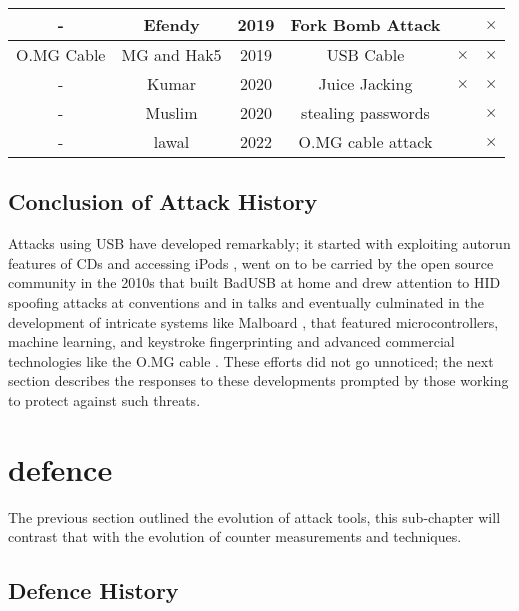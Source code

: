 {\begin{tabular}{|c c c c c c|}
 \hline
  - & Efendy\cite{efendyExploringPossibilityUSB2019} & 2019 & Fork Bomb Attack & & $\times$ \\
 \hline
 O.MG Cable & MG and Hak5  \cite{hak5MGCable} \cite{MGCable2019a} & 2019 & USB Cable & $\times$ & $\times$ \\
 \hline
- & Kumar \cite{kumarJuiceJackingUSB2020} & 2020 & Juice Jacking & $\times$ & $\times$ \\
\hline
- & Muslim \cite{muslimImplementationAnalysisUSB2020} & 2020 & stealing passwords & & $\times$ \\
\hline
-  & lawal \cite{lawalFacilitatingCyberenabledFraud2022} & 2022 & O.MG cable attack & & $\times$ \\
 \hline 
\end{tabular}
\label{attack_table}
}

\subsection{Conclusion of Attack History}

Attacks using USB have developed remarkably; it started with exploiting autorun features of CDs \cite{al-zarouniRealityRisksConsented2006}  and accessing iPods  \cite{SharpIdeasDownloads2006}, went on to be carried by the open source community \cite{NSAPlaysetTurnipschoolHtml} in the 2010s that built BadUSB at home \cite{SamyKamkarUSBdriveby} and drew attention to HID spoofing attacks at conventions and in talks \cite{Srlabsbadusbblackhatv1Pdf2014} and eventually culminated in the development of intricate systems like Malboard \cite{farhiMalboardNovelUser2019}, that featured microcontrollers, machine learning, and keystroke fingerprinting and advanced commercial technologies like the O.MG cable \cite{hak5MGCable}. These efforts did not go unnoticed; the next section describes the responses to these developments prompted by those working to protect against such threats.



\section{defence} \label{HistoryOfdefence}

The previous section outlined the evolution of attack tools, this sub-chapter will contrast that with the evolution of counter measurements and techniques. 


\subsection{Defence History} \label{defence_history}


